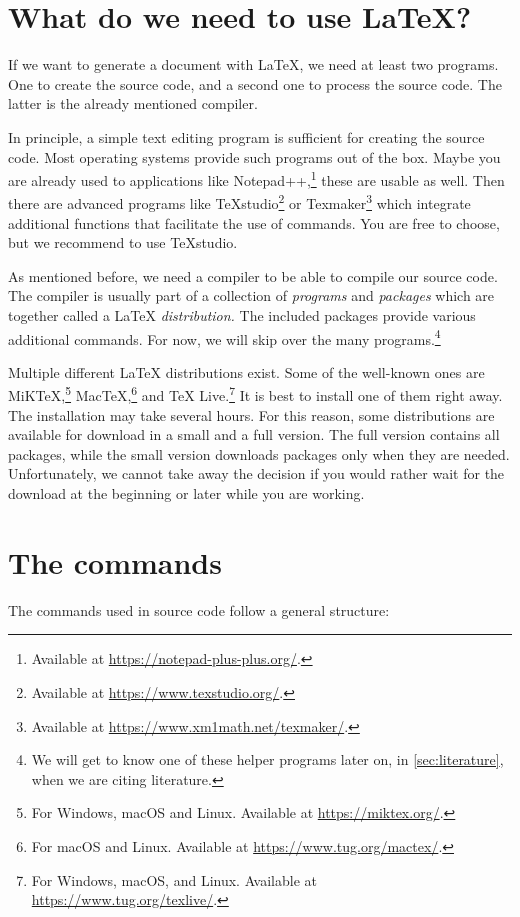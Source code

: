 \section{What do we need to use \LaTeX{}?}
\label{subsec:what-we-need}

If we want to generate a  document with \LaTeX{}, we need at least two programs. 
One to create the source code, and a second one to process the source code. 
The latter is the already mentioned compiler.

In principle, a simple text editing program is sufficient for creating the source code. 
Most operating systems provide such programs out of the box. 
Maybe you are already used to applications like Notepad++,\footnote{Available at \url{https://notepad-plus-plus.org/}.} these are usable as well. 
Then there are advanced programs like \TeX{}studio\footnote{Available at \url{https://www.texstudio.org/}.} or Texmaker\footnote{Available at \url{https://www.xm1math.net/texmaker/}.} which integrate additional functions that facilitate the use of commands.
You are free to choose, but we recommend to use \TeX{}studio.

As mentioned before, we need a compiler to be able to compile our source code.
The compiler is usually part of a collection of \emph{programs} and \emph{packages} which are together called a \LaTeX{} \emph{distribution}\textit{.} 
The included packages provide various additional commands. 
For now, we will skip over the many programs.\footnote{We will get to know one of these helper programs later on, in \ref{sec:literature}, when we are citing literature.}

Multiple different \LaTeX{} distributions exist. 
Some of the well-known ones are MiK\TeX,\footnote{For Windows, macOS and Linux. Available at \url{https://miktex.org/}.} Mac\TeX,\footnote{For macOS and Linux. Available at \url{https://www.tug.org/mactex/}.} and \TeX{} Live.\footnote{For Windows, macOS, and Linux. Available at \url{https://www.tug.org/texlive/}.}
It is best to install one of them right away. 
The installation may take several hours. 
For this reason, some distributions are available for download in a small and a full version. 
The full version contains all packages, while the small version downloads packages only when they are needed.
Unfortunately, we cannot take away the decision if you would rather wait for the download at the beginning or later while you are working.

\section{The commands}
\label{subsec:command-structure}
The commands used in source code follow a general structure:

